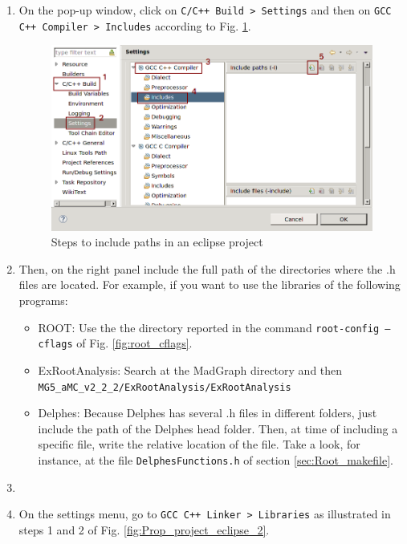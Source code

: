 \documentclass[12pt, oneside]{book}              %
\begin{document}
\begin{enumerate}
\item On the pop-up window, click on \texttt{C/C++ Build > Settings} and then 
on \texttt{GCC C++ Compiler > Includes} according to Fig. \ref{fig:Prop_project_eclipse}.

\begin{figure}[h]
\centering
\includegraphics[width=0.7\linewidth]{Imags_Doc/Prop_project_eclipse}
\caption[Steps to include paths in an eclipse project]{Steps to include paths in an eclipse project}
\label{fig:Prop_project_eclipse}
\end{figure}

\item Then, on the right panel include the full path of the directories where
the .h files are located. For example, if you want to use the libraries of
the following programs:

\begin{itemize}
	\item ROOT: Use the the directory reported in the command \texttt{root-config
		 --cflags} of Fig. \ref{fig:root_cflags}.
	\item ExRootAnalysis: Search at the MadGraph directory and then
	\texttt{MG5\_aMC\_v2\_2\_2/ExRootAnalysis/ExRootAnalysis}
	\item Delphes: Because Delphes has several .h files in different folders,
	just include the path of the Delphes head folder. Then, at time of including
	a specific file, write the relative location of the file. Take a look, for
	instance, at the file \texttt{DelphesFunctions.h} of section \ref{sec:Root_makefile}. 
\end{itemize}

\item

\item On the settings menu, go to \texttt{GCC C++ Linker > Libraries} 
as illustrated in steps 1 and 2 of Fig. \ref{fig:Prop_project_eclipse_2}.


\end{enumerate}
\end{document}
